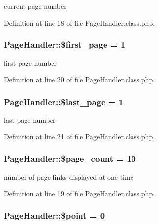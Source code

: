 current page number 



Definition at line 18 of file Page\-Handler.\-class.\-php.

\hypertarget{classPageHandler_adee671fac811b630df2886a43108b5ff}{
\subsubsection[{\$first\-\_\-page}]{\setlength{\rightskip}{0pt plus 5cm}Page\-Handler\-::\$first\-\_\-page = 1}}\label{classPageHandler_adee671fac811b630df2886a43108b5ff}


first page number 



Definition at line 20 of file Page\-Handler.\-class.\-php.

\hypertarget{classPageHandler_ad0a035b1ac1f86fe173d5ea4e8c2bef7}{
\subsubsection[{\$last\-\_\-page}]{\setlength{\rightskip}{0pt plus 5cm}Page\-Handler\-::\$last\-\_\-page = 1}}\label{classPageHandler_ad0a035b1ac1f86fe173d5ea4e8c2bef7}


last page number 



Definition at line 21 of file Page\-Handler.\-class.\-php.

\hypertarget{classPageHandler_a48a16aadd0c373c8856df7df954f90ff}{
\subsubsection[{\$page\-\_\-count}]{\setlength{\rightskip}{0pt plus 5cm}Page\-Handler\-::\$page\-\_\-count = 10}}\label{classPageHandler_a48a16aadd0c373c8856df7df954f90ff}


number of page links displayed at one time 



Definition at line 19 of file Page\-Handler.\-class.\-php.

\hypertarget{classPageHandler_a82a9b55cb98e79d46e6c6648cd2fca26}{
\subsubsection[{\$point}]{\setlength{\rightskip}{0pt plus 5cm}Page\-Handler\-::\$point = 0}}\label{classPageHandler_a82a9b55cb98e79d46e6c6648cd2fca26}


